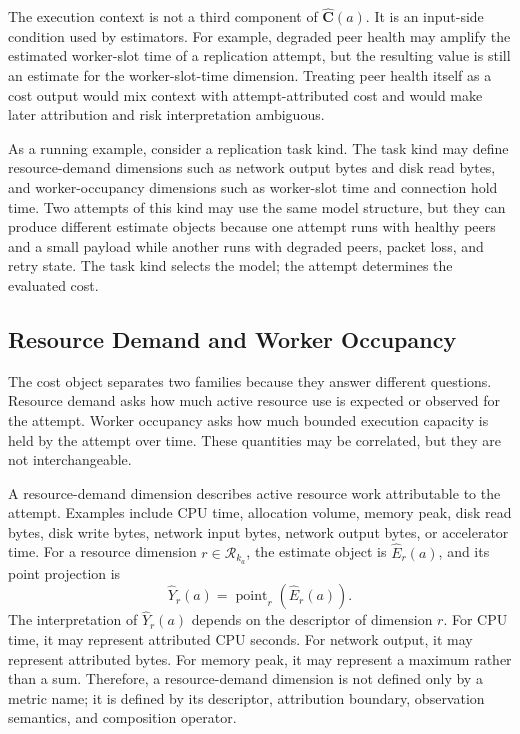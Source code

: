 The execution context is not a third component of
$\widehat{\mathbf{C}}(a)$. It is an input-side condition used by estimators.
For example, degraded peer health may amplify the estimated worker-slot time of
a replication attempt, but the resulting value is still an estimate for the
worker-slot-time dimension. Treating peer health itself as a cost output would
mix context with attempt-attributed cost and would make later attribution and
risk interpretation ambiguous.

As a running example, consider a replication task kind. The task kind may define
resource-demand dimensions such as network output bytes and disk read bytes, and
worker-occupancy dimensions such as worker-slot time and connection hold time.
Two attempts of this kind may use the same model structure, but they can produce
different estimate objects because one attempt runs with healthy peers and a
small payload while another runs with degraded peers, packet loss, and retry
state. The task kind selects the model; the attempt determines the evaluated
cost.

\subsection{Resource Demand and Worker Occupancy}
\label{sec:cost-demand-occupancy}

The cost object separates two families because they answer different questions.
Resource demand asks how much active resource use is expected or observed for
the attempt. Worker occupancy asks how much bounded execution capacity is held
by the attempt over time. These quantities may be correlated, but they are not
interchangeable.

A resource-demand dimension describes active resource work attributable to the
attempt. Examples include CPU time, allocation volume, memory peak, disk read
bytes, disk write bytes, network input bytes, network output bytes, or
accelerator time. For a resource dimension $r \in \mathcal{R}_{k_a}$, the
estimate object is $\widehat{E}_r(a)$, and its point projection is
\[
\widehat{Y}_r(a)
=
\operatorname{point}_r\!\left(\widehat{E}_r(a)\right).
\]
The interpretation of $\widehat{Y}_r(a)$ depends on the descriptor of
dimension $r$. For CPU time, it may represent attributed CPU seconds. For
network output, it may represent attributed bytes. For memory peak, it may
represent a maximum rather than a sum. Therefore, a resource-demand dimension is
not defined only by a metric name; it is defined by its descriptor, attribution
boundary, observation semantics, and composition operator.


